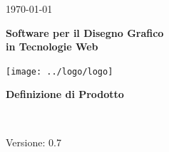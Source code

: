 \usepackage{multirow}

\title{\TITOLODOC}
\author{Stefano Dissegna}



\renewcommand{\insertversion}{0.7} %
\renewcommand{\TITOLODOC}{Definizione di Prodotto} %
\renewcommand{\glosspath}{.\glossario} %

\begin{titlepage}
\begin{center}
	\begin{Large}	\today \end{Large}
\end{center}

\vspace{20pt}

\begin{center}
	\begin{Huge}
				\textbf{\ajax}
	\end{Huge}
\end{center}			

\begin{center}
	\begin{large}
				\textbf{Software per il Disegno Grafico\\ in Tecnologie Web}
	\end{large}
\end{center}			

\vspace{20pt}

\begin{center}
\texttt{[image: ../logo/logo]}
\end{center}

\vspace{170pt}
\begin{center} %
	\begin{Huge}
				\textbf{\TITOLODOC}
	\end{Huge}
			\\
\end{center}
\vspace{190pt}
\begin{center}
Versione: \insertversion
\end{center}
\end{titlepage}

